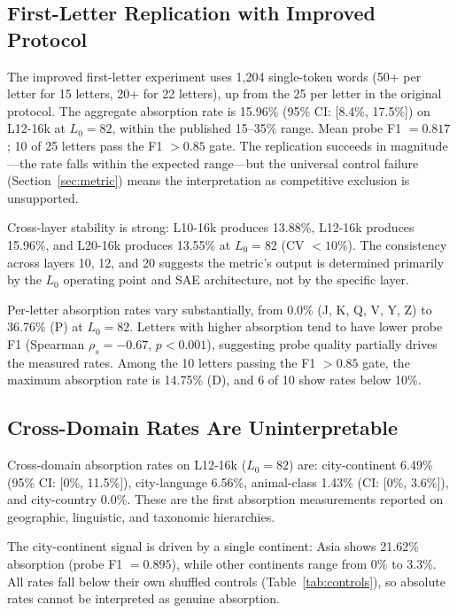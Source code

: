 \documentclass{article}
\begin{document}
\subsection{First-Letter Replication with Improved Protocol}

The improved first-letter experiment uses 1,204 single-token words (50+ per letter for 15 letters, 20+ for 22 letters), up from the 25 per letter in the original \citet{chanin2024absorption} protocol. The aggregate absorption rate is 15.96\% (95\% CI: [8.4\%, 17.5\%]) on L12-16k at $L_0{=}82$, within the published 15--35\% range. Mean probe F1 $= 0.817$; 10 of 25 letters pass the F1 $> 0.85$ gate. The replication succeeds in magnitude---the rate falls within the expected range---but the universal control failure (Section~\ref{sec:metric}) means the interpretation as competitive exclusion is unsupported.

Cross-layer stability is strong: L10-16k produces 13.88\%, L12-16k produces 15.96\%, and L20-16k produces 13.55\% at $L_0{=}82$ (CV $< 10\%$). The consistency across layers 10, 12, and 20 suggests the metric's output is determined primarily by the $L_0$ operating point and SAE architecture, not by the specific layer.

Per-letter absorption rates vary substantially, from 0.0\% (J, K, Q, V, Y, Z) to 36.76\% (P) at $L_0{=}82$. Letters with higher absorption tend to have lower probe F1 (Spearman $\rho_s = -0.67$, $p < 0.001$), suggesting probe quality partially drives the measured rates. Among the 10 letters passing the F1 $> 0.85$ gate, the maximum absorption rate is 14.75\% (D), and 6 of 10 show rates below 10\%.

\subsection{Cross-Domain Rates Are Uninterpretable}

Cross-domain absorption rates on L12-16k ($L_0{=}82$) are: city-continent 6.49\% (95\% CI: [0\%, 11.5\%]), city-language 6.56\%, animal-class 1.43\% (CI: [0\%, 3.6\%]), and city-country 0.0\%. These are the first absorption measurements reported on geographic, linguistic, and taxonomic hierarchies.

The city-continent signal is driven by a single continent: Asia shows 21.62\% absorption (probe F1 $= 0.895$), while other continents range from 0\% to 3.3\%. All rates fall below their own shuffled controls (Table~\ref{tab:controls}), so absolute rates cannot be interpreted as genuine absorption.
\end{document}
